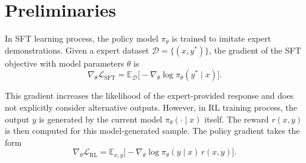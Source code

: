 




\section{Preliminaries}\label{sec:preliminaries}

In SFT learning process, the policy model $\pi_{\theta}$ is trained to imitate expert demonstrations. Given a expert dataset $\mathcal{D}=\{(x,y^{*})\}$, the gradient of the SFT objective with model parameters $\theta$ is
\begin{equation}
    \nabla_{\theta}\mathcal{L}_{\mathrm{SFT}}
    =
    \mathbb{E}_{\mathcal{D}}
    \big[
    -\nabla_{\theta}\log \pi_{\theta}(y^{*}\mid x)
    \big].
    \label{eq:sft_grad}
\end{equation}

This gradient increases the likelihood of the expert-provided response and does not explicitly consider alternative outputs. However, in RL training process, the output $y$ is generated by the current model $\pi_{\theta}(\cdot\mid x)$ itself. The reward $r(x, y)$ is then computed for this model-generated sample. The policy gradient takes the form
\begin{equation}
    \nabla_{\theta}\mathcal{L}_{\mathrm{RL}}
    =
    \mathbb{E}_{x,y}
    \big[
    -\nabla_{\theta}\log \pi_{\theta}(y\mid x)\, r(x,y)
    \big].
    \label{eq:rl_grad}
\end{equation}

